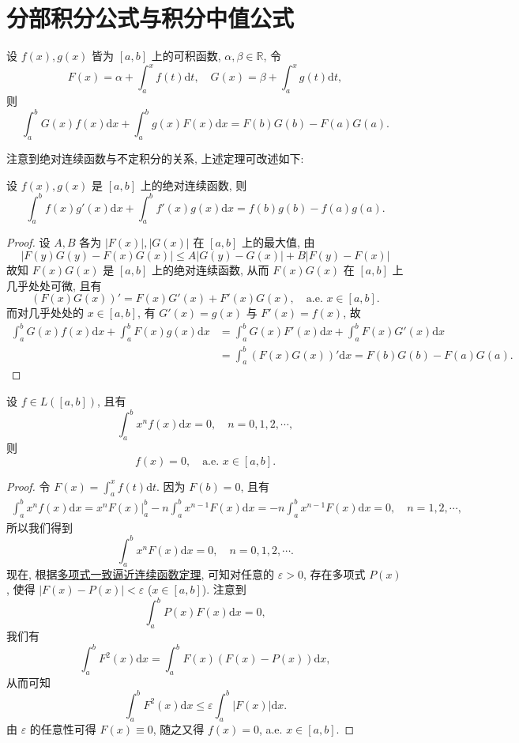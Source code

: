 \documentclass[../../main.tex]{subfiles}%
\begin{document}
\section{分部积分公式与积分中值公式}

\begin{theorem}[分部积分公式]\label{theorem:实变函数--分部积分公式}
设 $f(x),g(x)$ 皆为 $[a,b]$ 上的可积函数, $\alpha,\beta\in\mathbb{R}$, 令
\[
F(x) = \alpha + \int_a^x f(t)\mathrm{d}t,\quad G(x) = \beta + \int_a^x g(t)\mathrm{d}t,
\]
则
\[
\int_a^b G(x)f(x)\mathrm{d}x + \int_a^b g(x)F(x)\mathrm{d}x = F(b)G(b) - F(a)G(a). \tag{5.13}
\]
\end{theorem}
\begin{remark}
注意到绝对连续函数与不定积分的关系, 上述定理可改述如下:

设 $f(x),g(x)$ 是 $[a,b]$ 上的绝对连续函数, 则
\[
\int_a^b f(x)g'(x)\mathrm{d}x + \int_a^b f'(x)g(x)\mathrm{d}x = f(b)g(b) - f(a)g(a).
\]
\end{remark}
\begin{proof}
设 $A,B$ 各为 $|F(x)|,|G(x)|$ 在 $[a,b]$ 上的最大值, 由
\[
|F(y)G(y)-F(x)G(x)| \leqslant A|G(y)-G(x)| + B|F(y)-F(x)|
\]
故知 $F(x)G(x)$ 是 $[a,b]$ 上的绝对连续函数, 从而 $F(x)G(x)$ 在 $[a,b]$ 上几乎处处可微, 且有
\[
(F(x)G(x))' = F(x)G'(x) + F'(x)G(x),\quad \text{a.e. } x\in[a,b].
\]
而对几乎处处的 $x\in[a,b]$, 有 $G'(x)=g(x)$ 与 $F'(x)=f(x)$, 故
\begin{align*}
\int_a^b G(x)f(x)\mathrm{d}x + \int_a^b F(x)g(x)\mathrm{d}x
&= \int_a^b G(x)F'(x)\mathrm{d}x + \int_a^b F(x)G'(x)\mathrm{d}x \\
&= \int_a^b (F(x)G(x))'\mathrm{d}x = F(b)G(b) - F(a)G(a).
\end{align*}
\end{proof}

\begin{example}
设 $f\in L([a,b])$, 且有
\[
\int_a^b x^n f(x)\mathrm{d}x = 0,\quad n=0,1,2,\cdots,
\]
则
\[
f(x)=0,\quad \text{a.e. } x\in[a,b].
\]
\end{example}
\begin{proof}
令 $F(x) = \int_a^x f(t)\mathrm{d}t$. 因为 $F(b)=0$, 且有
\begin{align*}
\int_a^b x^n f(x)\mathrm{d}x = x^n F(x)\Big|_a^b - n\int_a^b x^{n-1}F(x)\mathrm{d}x 
= -n\int_a^b x^{n-1}F(x)\mathrm{d}x = 0,\quad n=1,2,\cdots,
\end{align*}
所以我们得到
\[
\int_a^b x^n F(x)\mathrm{d}x = 0,\quad n=0,1,2,\cdots.
\]
现在, 根据\hyperref[Basis of Analytics-theorem:多项式逼近有限阶光滑函数-Weierstrass逼近定理]{多项式一致逼近连续函数定理}, 可知对任意的 $\varepsilon>0$, 存在多项式 $P(x)$, 使得 $|F(x)-P(x)|<\varepsilon$ ($x\in[a,b]$). 注意到
\[
\int_a^b P(x)F(x)\mathrm{d}x = 0,
\]
我们有
\[
\int_a^b F^2(x)\mathrm{d}x = \int_a^b F(x)(F(x)-P(x))\mathrm{d}x,
\]
从而可知
\[
\int_a^b F^2(x)\mathrm{d}x \leqslant \varepsilon\int_a^b |F(x)|\mathrm{d}x.
\]
由 $\varepsilon$ 的任意性可得 $F(x)\equiv 0$, 随之又得 $f(x)=0$, a.e. $x\in[a,b]$.
\end{proof}
\end{document}
